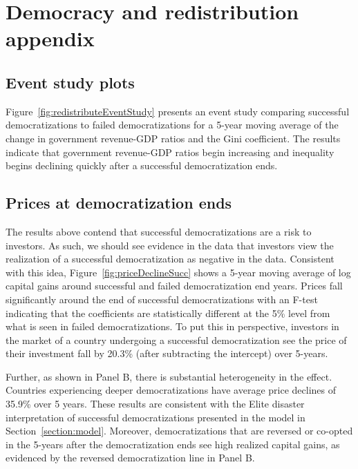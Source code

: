 
\section{Democracy and redistribution appendix}\label{section:redistributeRobustness}

\subsection{Event study plots}\label{section:eventStudyRedist}

Figure~\ref{fig:redistributeEventStudy} presents an event study comparing successful democratizations to failed democratizations for a 5-year moving average of the change in government revenue-GDP ratios and the Gini coefficient. The results indicate that government revenue-GDP ratios begin increasing and inequality begins declining quickly after a successful democratization ends.



\subsection{Prices at democratization ends}\label{section:demEnd}

The results above contend that successful democratizations are a risk to investors. As such, we should see evidence in the data that investors view the realization of a successful democratization as negative in the data. Consistent with this idea, Figure~\ref{fig:priceDeclineSucc} shows a 5-year moving average of log capital gains around successful and failed democratization end years.  Prices fall significantly around the end of successful democratizations with an F-test indicating that the coefficients are statistically different at the 5\% level from what is seen in failed democratizations.  To put this in perspective, investors in the market of a country undergoing a successful democratization see the price of their investment fall by 20.3\% (after subtracting the intercept) over 5-years.  

Further, as shown in Panel B, there is substantial heterogeneity in the effect.  Countries experiencing deeper democratizations have average price declines of 35.9\% over 5 years. These results are consistent with the Elite disaster interpretation of successful democratizations presented in the model in Section~\ref{section:model}.  Moreover, democratizations that are reversed or co-opted in the 5-years after the democratization ends see high realized capital gains, as evidenced by the reversed democratization line in Panel B.

